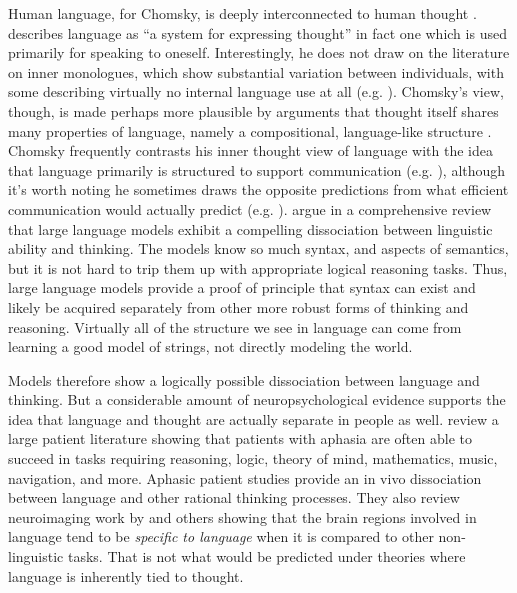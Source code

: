\documentclass[output=paper,colorlinks,citecolor=brown
]{langscibook}
\begin{document}
Human language, for Chomsky, is deeply interconnected to human thought \citep{everaert2015structures}. \cite{chomsky2002nature} describes language as ``a system for expressing thought'' in fact one which is used primarily for speaking to oneself. Interestingly, he does not draw on the literature on inner monologues, which show substantial variation between individuals, with some describing virtually no internal language use at all (e.g. \cite{reed1916existence,heavey2008phenomena,roebuck2020internal}). Chomsky's view, though, is made perhaps more plausible by arguments that thought itself shares many properties of language, namely a compositional, language-like structure \citep{fodor1975language,fodor1988connectionism,goodman2014concepts,piantadosi2016four,quilty2022best}. Chomsky frequently contrasts his inner thought view of language with the idea that language primarily is structured to support communication (e.g. \cite{hockett1959animal,bates1982functionalist,gibson2019efficiency}), although it's worth noting he sometimes draws the opposite predictions from what efficient communication would actually predict (e.g. \cite{piantadosi2012communicative}). \cite{mahowald2023dissociating} argue in a comprehensive review that large language models exhibit a compelling dissociation between linguistic ability and thinking. The models know so much syntax, and aspects of semantics, but it is not hard to trip them up with appropriate logical reasoning tasks. Thus, large language models provide a proof of principle that syntax can exist and likely be acquired separately from other more robust forms of thinking and reasoning. Virtually all of the structure we see in language can come from learning a good model of strings, not directly modeling the world. 

Models therefore show a logically possible dissociation between language and thinking. But a considerable amount of neuropsychological evidence supports the idea that language and thought are actually separate in people as well. \cite{fedorenko2016language} review a large patient literature showing that patients with aphasia are often able to succeed in tasks requiring reasoning, logic, theory of mind, mathematics, music, navigation, and more. Aphasic patient studies provide an in vivo dissociation between language and other rational thinking processes. They also review neuroimaging work by \cite{fedorenko2011functional} and others showing that the brain regions involved in language tend to be \emph{specific to language} when it is compared to other non-linguistic tasks. That is not what would be predicted under theories where language is inherently tied to thought. 
\end{document}
